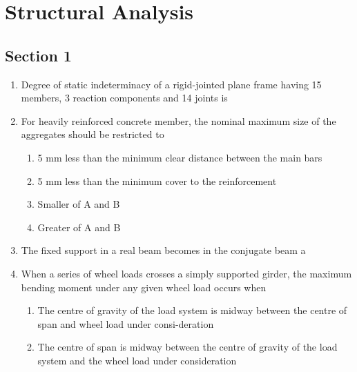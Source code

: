 \documentclass[11pt,a4paper]{article}
\begin{document}
\section{Structural Analysis}
\subsection*{Section 1}
\begin{enumerate}
\item{Degree of static indeterminacy of a rigid-jointed plane frame having 15 members, 3 reaction components and 14 joints is}
\\
\item{For heavily reinforced concrete member, the nominal maximum size of the aggregates should be restricted to}
\begin{enumerate}[label=\Alph*.]
\item{5 mm less than the minimum clear distance between the main bars}
\item{5 mm less than the minimum cover to the reinforcement}
\item{Smaller of A and B}
\item{Greater of A and B}
\end{enumerate}
\item{The fixed support in a real beam becomes in the conjugate beam a}
\\
\item{When a series of wheel loads crosses a simply supported girder, the maximum bending moment under any given wheel load occurs when}
\begin{enumerate}[label=\Alph*.]
\item{The centre of gravity of the load system is midway between the centre of span and wheel load under consi-deration}
\item{The centre of span is midway between the centre of gravity of the load system and the wheel load under consideration}

\end{enumerate}
\end{enumerate}
\end{document}
